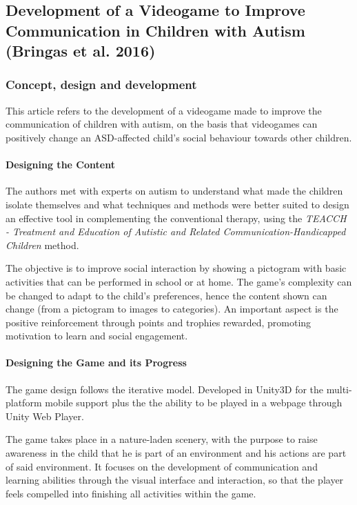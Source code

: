 \documentclass[runningheads]{llncs}
\begin{document}
\subsection{Development of a Videogame to Improve Communication in Children with Autism (Bringas et al. 2016)}

\subsubsection{Concept, design and development}
\par This article refers to the development of a videogame made to improve the communication of children with autism, on the basis that videogames can positively change an ASD-affected child's social behaviour towards other children.

\paragraph{Designing the Content} The authors met with experts on autism to understand what made the children isolate themselves and what techniques and methods were better suited to design an effective tool in complementing the conventional therapy, using the \textit{TEACCH - Treatment and Education of Autistic and Related Communication-Handicapped Children} method.
\par The objective is to improve social interaction by showing a pictogram with basic activities that can be performed in school or at home.
The game's complexity can be changed to adapt to the child's preferences, hence the content shown can change (from a pictogram to images to categories). An important aspect is the positive reinforcement through points and trophies rewarded, promoting motivation to learn and social engagement.

\paragraph{Designing the Game and its Progress} The game design follows the iterative model. Developed in Unity3D for the multi-platform mobile support plus the the ability to be played in a webpage through Unity Web Player.
\par The game takes place in a nature-laden scenery, with the purpose to raise awareness in the child that he is part of an environment and his actions are part of said environment. It focuses on the development of communication and learning abilities through the visual interface and interaction, so that the player feels compelled into finishing all activities within the game.
\end{document}
